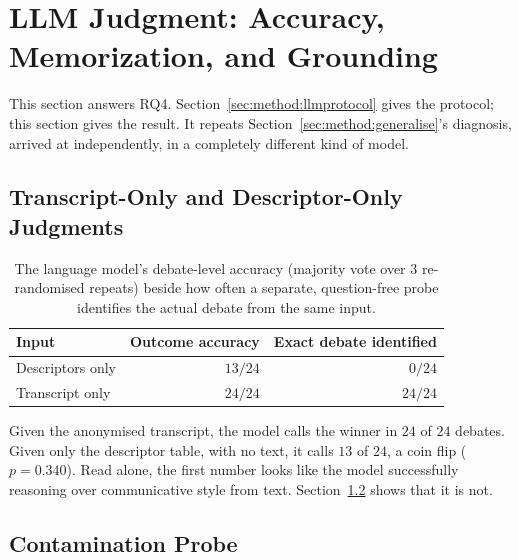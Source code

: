 \documentclass[journal]{IEEEtran}
\begin{document}
\section{LLM Judgment: Accuracy, Memorization, and Grounding}
\label{sec:method:llm}

This section answers RQ4. Section~\ref{sec:method:llmprotocol} gives the
protocol; this section gives the result. It repeats
Section~\ref{sec:method:generalise}'s diagnosis, arrived at independently, in
a completely different kind of model.

\subsection{Transcript-Only and Descriptor-Only Judgments}
\label{sec:llm:accuracy}

\begin{table}[t]
\caption{The language model's debate-level accuracy (majority vote over $3$
re-randomised repeats) beside how often a separate, question-free probe
identifies the actual debate from the same input.}
\label{tab:crossmodal}
\centering
\footnotesize
\setlength{\tabcolsep}{4pt}
\begin{tabular}{lrr}
\toprule
Input             & Outcome accuracy & Exact debate identified \\
\midrule
Descriptors only  & $13/24$          & $0/24$ \\
Transcript only   & $24/24$          & $24/24$ \\
\bottomrule
\end{tabular}
\end{table}

Given the anonymised transcript, the model calls the winner in $24$ of $24$
debates. Given only the descriptor table, with no text, it calls $13$ of
$24$, a coin flip ($p = 0.340$). Read alone, the first number looks like the
model successfully reasoning over communicative style from text.
Section~\ref{sec:llm:contamination} shows that it is not.

\subsection{Contamination Probe}
\label{sec:llm:contamination}
\end{document}
